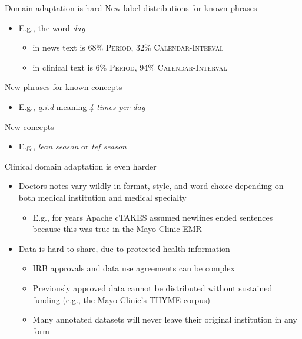 \documentclass[14pt]{beamer}
\begin{document}
\begin{frame}{Domain adaptation is hard}
New label distributions for known phrases
\begin{itemize}
\item E.g., the word \textit{day}
\begin{itemize}
\item in news text is 68\% \textsc{Period}, 32\% \textsc{Calendar-Interval}
\item in clinical text is 6\% \textsc{Period}, 94\% \textsc{Calendar-Interval}
\end{itemize}
\end{itemize}

\pause
\bigskip
New phrases for known concepts
\begin{itemize}
\item E.g., \textit{q.i.d} meaning \textit{4 times per day}
\end{itemize}

\pause
\bigskip
New concepts
\begin{itemize}
\item E.g., \textit{lean season} or \textit{tef season}
\end{itemize}
\end{frame}

\begin{frame}{Clinical domain adaptation is even harder}
\begin{itemize}
\item Doctors notes vary wildly in format, style, and word choice depending on both medical institution and medical specialty
\begin{itemize}
\item E.g., for years Apache cTAKES assumed newlines ended sentences because this was true in the Mayo Clinic EMR
\end{itemize}
\pause
\item Data is hard to share, due to protected health information
\begin{itemize}
\item IRB approvals and data use agreements can be complex
\item Previously approved data cannot be distributed without sustained funding (e.g., the Mayo Clinic's THYME corpus)
\item Many annotated datasets will never leave their original institution in any form
\end{itemize}
\end{itemize}
\end{frame}
\end{document}
